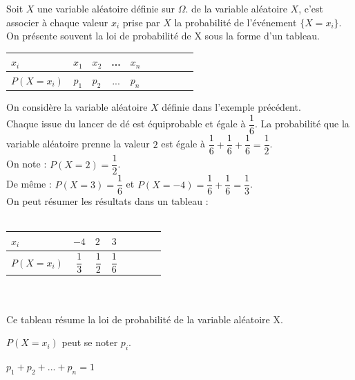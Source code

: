 \begin{bdefi}
    Soit $X$ une variable aléatoire définie sur $\Omega$.  de la variable aléatoire $X$, c’est associer à chaque valeur $x_i$ prise par $X$ la probabilité de l’événement $\{X=x_i\}$.\\
    On présente souvent la loi de probabilité de X sous la forme d’un tableau.\\
    
    \begin{tabular}{ | Xc | Xc | Xc | Xc | Xc |}
     \hline			
       $x_i$  & $x_1$ & $x_2$ & ... & $x_n$ \\ \hline
       $P(X=x_i)$ & $p_1$ & $p_2$ & ... & $p_n$ \\
     \hline  
    \end{tabular}
    
\end{bdefi}

\begin{bexemple}
    On considère la variable aléatoire $X$ définie dans l'exemple précédent.\\
    Chaque issue du lancer de dé est équiprobable et égale à $\dfrac{1}{6}$.
    La probabilité que la variable aléatoire prenne la valeur $2$ est égale à $\dfrac{1}{6} + \dfrac{1}{6} + \dfrac{1}{6} = \dfrac{1}{2}$.\\
    On note : $P(X = 2) = \dfrac{1}{2}$.\\
    De même : $P(X = 3) = \dfrac{1}{6}$ et $P(X = -4) = \dfrac{1}{6} + \dfrac{1}{6} = \dfrac{1}{3}$.
    \\
    On peut résumer les résultats dans un tableau :\\
    \ \\
    \begin{tabular}{ | Xc | Xc | Xc | Xc | }
     \hline			
       $x_i$  & $-4$ & $2$ & $3$ \\ \hline
       $P(X=x_i)$ & $\dfrac{1}{3}$ & $\dfrac{1}{2}$ & $\dfrac{1}{6}$ \\
     \hline  
    \end{tabular}\\
    \ \\
    Ce tableau résume la loi de probabilité de la variable aléatoire X.
\end{bexemple}


\begin{brmqs}
    \begin{itemRem}
        \item $P(X = x_i)$ peut se noter $p_i$.
        \item $p_1 + p_2 + ... + p_n = 1$
    \end{itemRem}
\end{brmqs}

